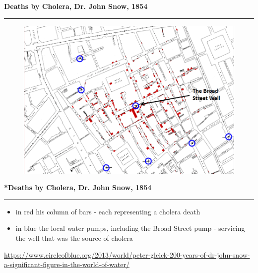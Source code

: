\documentclass[pdf]{beamer}
\begin{document}
\begin{frame}
	{{\textbf{Deaths by Cholera, Dr. John Snow, 1854}}}{\textcolor{red}{\rule{12cm}{1.2pt}}}
	
\begin{figure}
\includegraphics[scale=0.4]{18_Cholerafull_905.png}
\end{figure}

\end{frame}



\begin{frame}
	{{\textbf{*Deaths by Cholera, Dr. John Snow, 1854}}}{\textcolor{red}{\rule{12cm}{1.2pt}}}
		
\begin{itemize}
\item
in red his column of bars - each representing a cholera death

\item
in blue the local water pumps, including the Broad Street pump - servicing the well that was the source of cholera
\end{itemize}

\url{https://www.circleofblue.org/2013/world/peter-gleick-200-years-of-dr-john-snow-a-significant-figure-in-the-world-of-water/}

\end{frame}
\end{document}
